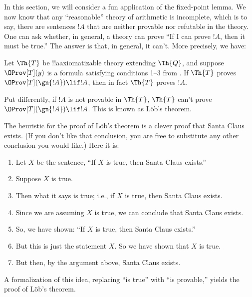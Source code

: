 \documentclass[../../../include/open-logic-section]{subfiles}
\begin{document}


\newcommand{\pt}{\fn{Prov}_T}

In this section, we will consider a fun application of the fixed-point
lemma. We now know that any ``reasonable'' theory of arithmetic is
incomplete, which is to say, there are sentences $!A$ that are neither
provable nor refutable in the theory. One can ask whether, in general,
a theory can prove ``If I can prove $!A$, then it must be true.'' The
answer is that, in general, it can't. More precisely, we have:

\begin{thm}
Let $\Th{T}$ be !!a{axiomatizable} theory extending $\Th{Q}$, and
suppose $\OProv[T](y)$ is a formula satisfying conditions 1--3 from
. If $\Th{T}$ proves $\OProv[T](\gn{!A}) \lif !A$,
then in fact $\Th{T}$ proves $!A$.
\end{thm}
Put differently, if $!A$ is not provable in $\Th{T}$, $\Th{T}$ can't
prove $\OProv[T](\gn{!A}) \lif !A$. This is known as L\"ob's theorem.

The heuristic for the proof of L\"ob's theorem is a clever proof that
Santa Claus exists. (If you don't like that conclusion, you are free
to substitute any other conclusion you would like.) Here it is:
\begin{enumerate}
\item Let $X$ be the sentence, ``If $X$ is true, then Santa Claus
  exists.''
\item Suppose $X$ is true.
\item Then what it says is true; i.e., if $X$ is true, then
  Santa Claus exists.
\item Since we are assuming $X$ is true, we can conclude that
  Santa Claus exists.
\item So, we have shown: ``If $X$ is true, then Santa Claus exists.''
\item But this is just the statement $X$. So we have shown that $X$ is
  true.
\item But then, by the argument above, Santa Claus exists.
\end{enumerate}
A formalization of this idea, replacing ``is true'' with ``is
provable,'' yields the proof of L\"ob's theorem. 
\end{document}
